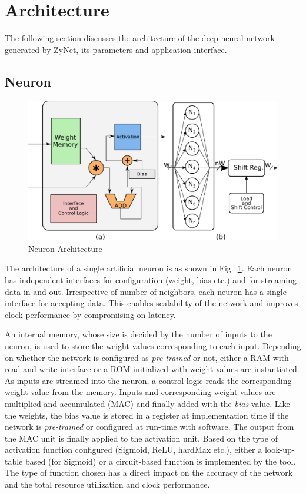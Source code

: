 \section{Architecture}
The following section discusses the architecture of the deep neural network generated by ZyNet, its parameters and application interface.
\subsection{Neuron}
\begin{figure}[!t]
\centering
   \includegraphics[width=\columnwidth]{Figures/neuron.pdf}
   \caption{Neuron Architecture}
   \label{fig:neuron}
   \vspace{-3mm}
\end{figure}
The architecture of a single artificial neuron is as shown in Fig.~\ref{fig:neuron}.
Each neuron has independent interfaces for configuration (weight, bias etc.) and for streaming data in and out.
Irrespective of number of neighbors, each neuron has a single interface for accepting data.
This enables scalability of the network and improves clock performance by compromising on latency. 

An internal memory, whose size is decided by the number of inputs to the neuron, is used to store the weight values corresponding to each input.
Depending on whether the network is configured as \emph{pre-trained} or not, either a RAM with read and write interface or a ROM initialized with weight values are instantiated.
As inputs are streamed into the neuron, a control logic reads the corresponding weight value from the memory.
Inputs and corresponding weight values are multiplied and accumulated (MAC) and finally added with the \emph{bias} value.
Like the weights, the bias value is stored in a register at implementation time if the network is \emph{pre-trained} or configured at run-time with software.
The output from the MAC unit is finally applied to the activation unit.
Based on the type of activation function configured (Sigmoid, ReLU, hardMax etc.), either a look-up-table based (for Sigmoid) or a circuit-based function is implemented by the tool.
The type of function chosen has a direct impact on the accuracy of the network and the total resource utilization and clock performance. 

